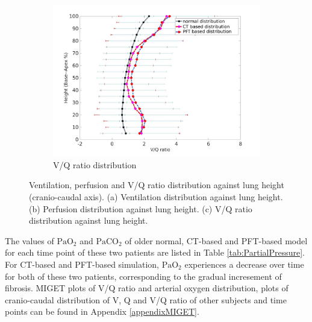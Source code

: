 \begin{figure}[htbp]
\begin{subfigure}{.6\linewidth}
  \includegraphics[width=\linewidth,trim={{.0\wd0} {.0\wd0} {.0\wd0} {.0\wd0}},clip]{ModelBasedAnalysis/Image/VQAgainstLungHeight.jpg}
  \caption{V/Q ratio distribution}
  \label{fig:VQDistribution-c}
\end{subfigure}
\caption{ Ventilation, perfusion and V/Q ratio distribution against lung height (cranio-caudal axis). (a) Ventilation distribution against lung height. (b) Perfusion distribution against lung height. (c) V/Q ratio distribution against lung height.}
\label{fig:VQDistribution}
\end{figure}

The values of $\mathrm{PaO_2}$ and $\mathrm{PaCO_2}$ of older normal, CT-based and PFT-based model for each time point of these two patients are listed in Table \ref{tab:PartialPressure}. For CT-based and PFT-based simulation, $\mathrm{PaO_2}$ experiences a decrease over time for both of these two patients, corresponding to the gradual incresement of fibrosis.  MIGET plots of V/Q ratio and arterial oxygen distribution, plots of cranio-caudal distribution of V, Q and V/Q ratio of other subjects and time points can be found in Appendix \ref{appendixMIGET}.

